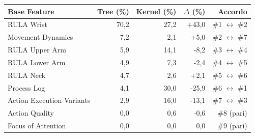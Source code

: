 \begin{tabular*}{\linewidth}{@{}l@{\extracolsep{\fill}}rrrr@{}}
\toprule
\textbf{Base Feature} & \textbf{Tree (\%)} & \textbf{Kernel (\%)} & \textbf{$\Delta$ (\%)} & \textbf{Accordo} \\
\midrule
RULA Wrist & 70{,}2 & 27{,}2 & +43{,}0 & \#1 $\leftrightarrow$ \#2 \\
Movement Dynamics & 7{,}2 & 2{,}1 & +5{,}0 & \#2 $\leftrightarrow$ \#7 \\
RULA Upper Arm & 5{,}9 & 14{,}1 & -8{,}2 & \#3 $\leftrightarrow$ \#4 \\
RULA Lower Arm & 4{,}9 & 7{,}3 & -2{,}4 & \#4 $\leftrightarrow$ \#5 \\
RULA Neck & 4{,}7 & 2{,}6 & +2{,}1 & \#5 $\leftrightarrow$ \#6 \\
Process Log & 4{,}1 & 30{,}0 & -25{,}9 & \#6 $\leftrightarrow$ \#1 \\
Action Execution Variants & 2{,}9 & 16{,}0 & -13{,}1 & \#7 $\leftrightarrow$ \#3 \\
Action Quality & 0{,}0 & 0{,}6 & -0{,}6 & \#8 (pari) \\
Focus of Attention & 0{,}0 & 0{,}0 & 0{,}0 & \#9 (pari) \\
\bottomrule
\end{tabular*}
